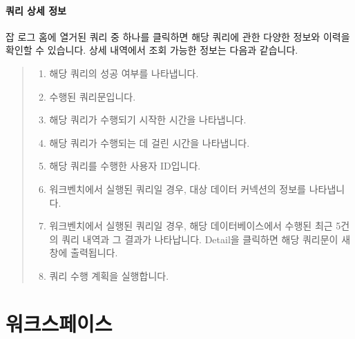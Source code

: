 \documentclass[letterpaper,10pt,english]{sphinxmanual}
\begin{document}
\subsubsection{쿼리 상세 정보}
\label{\detokenize{discovery/part02/data_monitoring:id4}}
잡 로그 홈에 열거된 쿼리 중 하나를 클릭하면 해당 쿼리에 관한 다양한 정보와 이력을 확인할 수 있습니다. 상세 내역에서 조회 가능한 정보는 다음과 같습니다.
\begin{quote}

\begin{figure}[H]
\centering

\noindent{}
\end{figure}
\begin{enumerate}
\def\theenumi{\arabic{enumi}}
\def\labelenumi{\theenumi .}
\makeatletter\def\p@enumii{\p@enumi \theenumi .}\makeatother
\item {} 
 해당 쿼리의 성공 여부를 나타냅니다.

\item {} 
 수행된 쿼리문입니다.

\item {} 
 해당 쿼리가 수행되기 시작한 시간을 나타냅니다.

\item {} 
 해당 쿼리가 수행되는 데 걸린 시간을 나타냅니다.

\item {} 
 해당 쿼리를 수행한 사용자 ID입니다.

\item {} 
 워크벤치에서 실행된 쿼리일 경우, 대상 데이터 커넥션의 정보를 나타냅니다.

\item {} 
 워크벤치에서 실행된 쿼리일 경우, 해당 데이터베이스에서 수행된 최근 5건의 쿼리 내역과 그 결과가 나타납니다. Detail을 클릭하면 해당 쿼리문이 새 창에 출력됩니다.

\item {} 
 쿼리 수행 계획을 실행합니다.

\end{enumerate}
\end{quote}


\chapter{워크스페이스}
\label{\detokenize{discovery/part03/index:id1}}\label{\detokenize{discovery/part03/index::doc}}
\begin{figure}[H]
\centering

\noindent{}
\end{figure}
\end{document}

